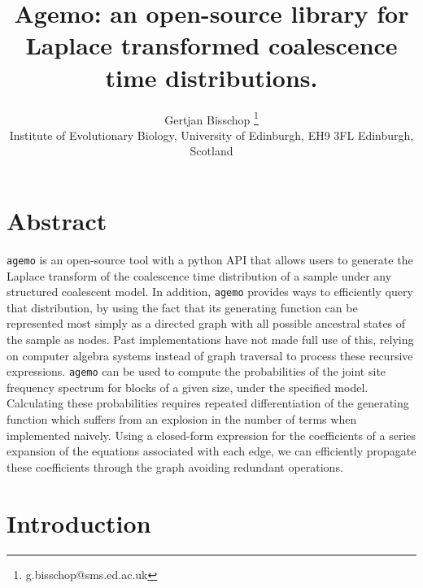 \documentclass[10pt, a4]{article}
\title{Agemo: an open-source library for Laplace transformed coalescence time distributions.}
\author{Gertjan Bisschop \thanks{g.bisschop@sms.ed.ac.uk} \\ Institute of Evolutionary Biology, University of Edinburgh, EH9 3FL Edinburgh, Scotland}
\date{}
\begin{document}
\maketitle

\section*{Abstract} %
\texttt{agemo} is an open-source tool with a python API that allows users to generate the Laplace transform of the coalescence time distribution of a sample under any structured coalescent model. In addition, \texttt{agemo} provides ways to efficiently query that distribution, by using the fact that its generating function can be represented most simply as a directed graph with all possible ancestral states of the sample as nodes. Past implementations have not made full use of this, relying on computer algebra systems instead of graph traversal to process these recursive expressions.
\texttt{agemo} can be used to compute the probabilities of the joint site frequency spectrum for blocks of a given size, under the specified model. Calculating these probabilities requires repeated differentiation of the generating function which suffers from an explosion in the number of terms when implemented naively. Using a closed-form expression for the coefficients of a series expansion of the equations associated with each edge, we can efficiently propagate these coefficients through the graph avoiding redundant operations.

\vspace{0.25cm} 
\linenumbers

\section{Introduction}
\end{document}
